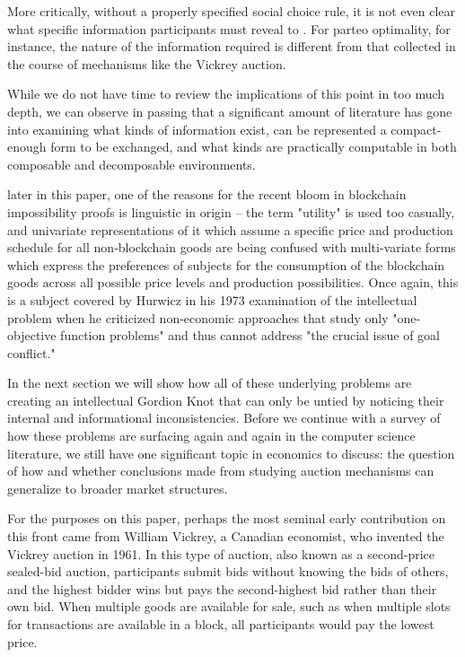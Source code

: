 \documentclass[sigconf,anonymous]{aamas}
\begin{document}
More critically, without a properly specified social choice rule, it is not even clear what specific information participants must reveal to . For parteo optimality, for instance, the nature of the information required is different from that collected in the course of mechanisms like the Vickrey auction.

While we do not have time to review the implications of this point in too much depth, we can observe in passing that a significant amount of literature has gone into examining what kinds of information exist, can be represented a compact-enough form to be exchanged, and what kinds are practically computable in both composable and decomposable environments. 




 later in this paper, one of the reasons for the recent bloom in blockchain impossibility proofs is linguistic in origin -- the term "utility" is used too casually, and univariate representations of it which assume a specific price and production schedule for all non-blockchain goods are being confused with multi-variate forms which express the preferences of subjects for the consumption of the blockchain goods across all possible price levels and production possibilities. Once again, this is a subject covered by Hurwicz in his 1973 examination of the intellectual problem when he criticized non-economic approaches that study only "one-objective function problems" and thus cannot address "the crucial issue of goal conflict."

In the next section we will show how all of these underlying problems are creating an intellectual Gordion Knot that can only be untied by noticing their internal and informational inconsistencies. Before we continue with a survey of how these problems are surfacing again and again in the computer science literature, we still have one significant topic in economics to discuss: the question of how and whether conclusions made from studying auction mechanisms can generalize to broader market structures.

For the purposes on this paper, perhaps the most seminal early contribution on this front came from William Vickrey, a Canadian economist, who invented the Vickrey auction in 1961. In this type of auction, also known as a second-price sealed-bid auction, participants submit bids without knowing the bids of others, and the highest bidder wins but pays the second-highest bid rather than their own bid. When multiple goods are available for sale, such as when multiple slots for transactions are available in a block, all participants would pay the lowest price.
\end{document}

